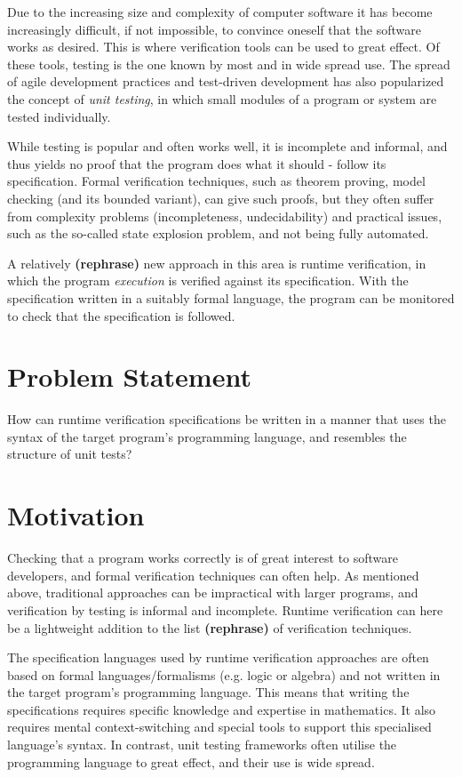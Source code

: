 \documentclass[a4paper,11pt]{kth-mag}
\newcommand{\rephrase}{\textbf{(rephrase)} }
\begin{document}
Due to the increasing size and complexity of computer software it has become
increasingly difficult, if not impossible, to convince oneself that the
software works as desired. This is where verification tools can be used to
great effect. Of these tools, testing is the one known by most and in wide
spread use.  The spread of agile development practices and test-driven
development has also popularized the concept of \textit{unit testing}, in which
small modules of a program or system are tested individually.

While testing is popular and often works well, it is incomplete and informal,
and thus yields no proof that the program does what it should - follow its
specification. Formal verification techniques, such as theorem proving, model
checking (and its bounded variant), can give such proofs, but they often suffer
from complexity problems (incompleteness, undecidability) and practical issues,
such as the so-called state explosion problem, and not being fully automated.

A relatively \rephrase new approach in this area is runtime verification, in
which the program \textit{execution} is verified against its specification.
With the specification written in a suitably formal language, the program can
be monitored to check that the specification is followed.


\section{Problem Statement}

How can runtime verification specifications be written in a manner that uses
the syntax of the target program’s programming language, and resembles
the structure of unit tests?

\section{Motivation}

Checking that a program works correctly is of great interest to software
developers, and formal verification techniques can often help. As mentioned
above, traditional approaches can be impractical with larger programs, and
verification by testing is informal and incomplete. Runtime verification can
here be a lightweight addition to the list \rephrase of verification
techniques.

The specification languages used by runtime verification approaches are often
based on formal languages/formalisms (e.g. logic or algebra) and not written in
the target program's programming language.  This means that writing the
specifications requires specific knowledge and expertise in mathematics.  It
also requires mental context-switching and special tools to support this
specialised language's syntax. In contrast, unit testing frameworks often
utilise the programming language to great effect, and their use is wide spread.
\end{document}

